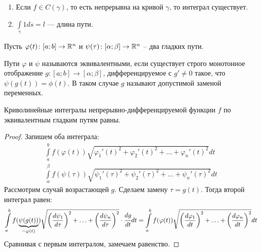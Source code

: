 \begin{Properties}
    \begin{enumerate}
        \item Если $f\in C(\gamma)$, то есть непрерывна на кривой $\gamma$, то интеграл существует.
        \item $\int\limits_{\gamma} 1ds = l$ --- длина пути.
    \end{enumerate}
\end{Properties}
Пусть $\varphi(t)\colon [a;b] \to \mathbb{R}^n$ и $\psi(\tau) \colon [\alpha; \beta] \to \mathbb{R}^n$ -- два гладких пути.
\begin{Def}
    Пути $\varphi$ и $\psi$ называются эквивалентными, если существует строго монотонное отображение $g\colon [a;b] \to [\alpha; \beta]$, дифференцируемое с $g' \neq 0$ такое, что $\psi(g(t)) = \phi(t)$. В таком случае $g$ называют допустимой заменой переменных.
\end{Def}
\begin{Statement}
    Криволинейные интегралы непрерывно-дифференцируемой функции $f$ по эквивалентным гладким путям равны.
\end{Statement}
\begin{proof}
    Запишем оба интеграла:
    \begin{gather}
        \int\limits_{a}^{b}f(\varphi(t))\sqrt{\varphi_1'(t)^2 + \varphi_2'(t)^2 + \ldots + \varphi_n'(t)^2}dt\\
        \int\limits_{\alpha}^{\beta}f(\psi(\tau))\sqrt{\psi_1'(\tau)^2 + \psi_2'(\tau)^2 + \ldots + \psi_n'(\tau)^2}dt
    \end{gather}
    Рассмотрим случай возрастающей $g$. Сделаем замену $\tau = g(t)$. Тогда второй интеграл равен:
    \begin{gather}
        \int\limits_{a}^{b}f(\underbrace{\psi(g(t))}_{=\varphi(t)})\sqrt{\left(\frac{d\psi_1}{d\tau}\right)^2 + \ldots + \left(\frac{d\psi_n}{d\tau}\right)^2}\cdot \cfrac{dg}{dt}dt 
        = \int\limits_{a}^{b}f(\varphi(t))\sqrt{\left(\frac{d\varphi_1}{dt}\right)^2 + \ldots + \left(\frac{d\varphi_n}{dt}\right)^2}dt
    \end{gather}
    Сравнивая с первым интегралом, замечаем равенство.
\end{proof}
